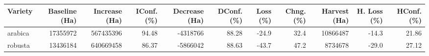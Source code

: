 \begin{table}[ht]
\centering
\begin{tabular}{lrrrrrrrrrr}
  \hline
Variety & Baseline (Ha) & Increase (Ha) & IConf. (\%) & Decrease (Ha) & DConf. (\%) & Loss (\%) & Chng. (\%) & Harvest (Ha) & H. Loss (\%) & HConf. (\%) \\ 
  \hline
arabica & 17355972 & 567435396 & 94.48 & -4318766 & 88.28 & -24.9 & 32.4 & 10866487 & -14.3 & 21.86 \\ 
  robusta & 13436184 & 640669458 & 86.37 & -5866042 & 88.63 & -43.7 & 47.2 & 8734678 & -29.0 & 27.12 \\ 
   \hline
\end{tabular}
\end{table}
